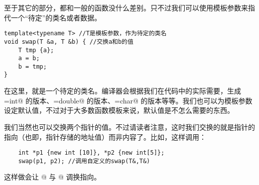 至于其它的部分，都和一般的函数没什么差别。只不过我们可以使用模板参数来指代一个``待定''的类名或者数据。
\begin{lstlisting}
template<typename T> //T是模板参数，作为待定的类名
void swap(T &a, T &b) { //交换a和b的值
    T tmp {a};
    a = b;
    b = tmp;
}
\end{lstlisting}
在这里，\lstinline@T@ 就是一个待定的类名。编译器会根据我们在代码中的实际需要，生成\lstinline@T=int@ 的版本、\linebreak\lstinline@T=double@ 的版本、\lstinline@T=char@ 的版本等等。我们也可以为模板参数设定默认值，不过对于大多数函数模板来说，默认值是不怎么需要的东西。\par
我们当然也可以交换两个指针的值。不过请读者注意，这时我们交换的就是指针的指向（也即，指针存储的地址值）而非内容了。比如，这样调用：
\begin{lstlisting}
    int *p1 {new int [10]}, *p2 {new int[5]};
    swap(p1, p2); //调用自定义的swap(T&,T&)
\end{lstlisting}
这样做会让 @ 与 @ 调换指向。\par
